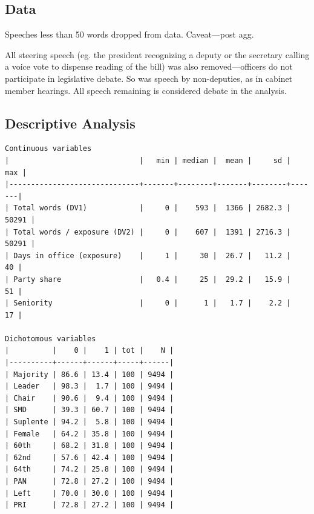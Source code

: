 \documentclass[letter,12pt]{article}
\begin{document}
  \subsection{Data}

Speeches less than 50 words dropped from data. Caveat---post agg.

All steering speech (eg. the president recognizing a deputy or the secretary calling a voice vote to dispense reading of the bill) was also removed---officers do not participate in legislative debate. So was speech by non-deputies, as in cabinet member hearings. All speech remaining is considered debate in the analysis.  


  

  \subsection{Descriptive Analysis}


  \begin{footnotesize}
    \begin{verbatim}
Continuous variables
|                              |   min | median |  mean |     sd |   max |
|------------------------------+-------+--------+-------+--------+-------|
| Total words (DV1)            |     0 |    593 |  1366 | 2682.3 | 50291 |
| Total words / exposure (DV2) |     0 |    607 |  1391 | 2716.3 | 50291 |
| Days in office (exposure)    |     1 |     30 |  26.7 |   11.2 |    40 |
| Party share                  |   0.4 |     25 |  29.2 |   15.9 |    51 |
| Seniority                    |     0 |      1 |   1.7 |    2.2 |    17 |

Dichotomous variables
|          |    0 |    1 | tot |    N |
|----------+------+------+-----+------|
| Majority | 86.6 | 13.4 | 100 | 9494 |
| Leader   | 98.3 |  1.7 | 100 | 9494 |
| Chair    | 90.6 |  9.4 | 100 | 9494 |
| SMD      | 39.3 | 60.7 | 100 | 9494 |
| Suplente | 94.2 |  5.8 | 100 | 9494 |
| Female   | 64.2 | 35.8 | 100 | 9494 |
| 60th     | 68.2 | 31.8 | 100 | 9494 |
| 62nd     | 57.6 | 42.4 | 100 | 9494 |
| 64th     | 74.2 | 25.8 | 100 | 9494 |
| PAN      | 72.8 | 27.2 | 100 | 9494 |
| Left     | 70.0 | 30.0 | 100 | 9494 |
| PRI      | 72.8 | 27.2 | 100 | 9494 |
    \end{verbatim}
  \end{footnotesize}
\end{document}
